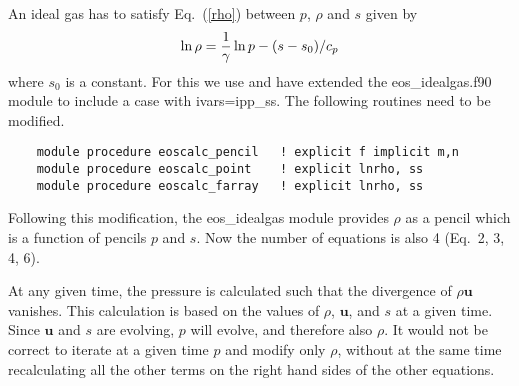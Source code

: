 \documentclass[mathleft]{article}
\begin{document}
An ideal gas has to satisfy Eq.~(\ref{rho}) between $p$, $\rho$ and $s$ given by
\begin{equation}
\ln\rho={1\over\gamma}\ln p-(s-s_0)/c_p
\end{equation}
where $s_0$ is a constant.
For this we use and have extended the eos\_idealgas.f90 module to include a case with ivars=ipp\_ss. The following routines need to be modified.
\begin{verbatim}
    module procedure eoscalc_pencil   ! explicit f implicit m,n
    module procedure eoscalc_point    ! explicit lnrho, ss
    module procedure eoscalc_farray   ! explicit lnrho, ss
\end{verbatim}
Following this modification, the eos\_idealgas module provides $\rho$ as a pencil which is a function of pencils $p$ and $s$.
Now the number of equations is also 4 (Eq.~2, 3, 4, 6).

At any given time, the pressure is calculated such that the divergence of
$\rho\bm{u}$ vanishes.
This calculation is based on the values of $\rho$, $\bm{u}$, and $s$
at a given time.
Since $\bm{u}$ and $s$ are evolving, $p$ will evolve,
and therefore also $\rho$.
It would not be correct to iterate at a given time $p$ and modify
only $\rho$, without at the same time recalculating all the other terms
on the right hand sides of the other equations.
\end{document}
